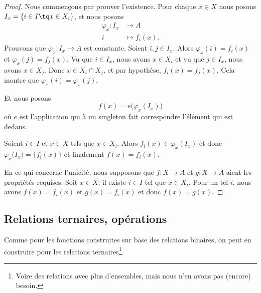 \begin{proof}
	Nous commençons par prouver l'existence. Pour chaque \( x\in X\) nous posons \( I_x=\{ i\in I\tq x\in X_i \}\), et nous posons
	\begin{equation}
		\begin{aligned}
			\varphi_x\colon I_x & \to A           \\
			i                   & \mapsto f_i(x).
		\end{aligned}
	\end{equation}
	Prouvons que \(\varphi_x \colon I_x\to A  \) est constante. Soient \( i,j\in I_x\). Alors \( \varphi_x(i)=f_i(x)\) et \( \varphi_x(j)=f_j(x)\). Vu que \( i\in I_x\), nous avons \( x\in X_i\) et vu que \( j\in I_x\), nous avons \( x\in X_j\). Donc \( x\in X_i\cap X_j\), et par hypothèse, \( f_i(x)=f_j(x)\). Cela montre que \( \varphi_x(i)=\varphi_x(j)\).

	Et nous posons
	\begin{equation}
		f(x)=e\big( \varphi_x(I_x) \big)
	\end{equation}
	où \( e\) est l'application qui à un singleton fait correspondre l'élément qui est dedans.

	Soient \( i\in I\) et \( x\in X\) tels que \( x\in X_i\). Alors \( f_i(x)\in \varphi_x(I_x)\) et donc
	\( \varphi_x\big( I_x \big)=\{ f_i(x) \}\) et finalement \( f(x)=f_i(x)\).

	En ce qui concerne l'unicité, nous supposons que \(f \colon X\to A  \) et \(g \colon X\to A  \) aient les propriétés requises. Soit \( x\in X\); il existe \( i\in I\) tel que \( x\in X_i\). Pour un tel \( i\), nous avons \( f(x)=f_i(x)\) et \( g(x)=f_i(x)\) et donc \( f(x)=g(x)\).
\end{proof}

\subsection{Relations ternaires, opérations}
\label{SUBooRelationsTernaires}

\begin{normaltext}	\label{NORMooRelationsTernaires}
	Comme pour les fonctions construites sur base des relations binaires, on peut en construire pour les relations ternaires\footnote{Voire des relations avec plus d'ensembles, mais nous n'en avons pas (encore) besoin.}.
\end{normaltext}

